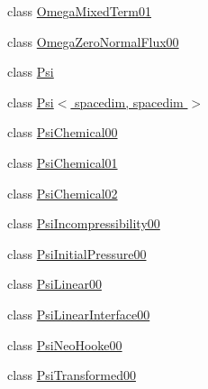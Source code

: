 \begin{DoxyCompactItemize}
\item 
class \hyperlink{classincremental_f_e_1_1_omega_mixed_term01}{Omega\+Mixed\+Term01}
\item 
class \hyperlink{classincremental_f_e_1_1_omega_zero_normal_flux00}{Omega\+Zero\+Normal\+Flux00}
\item 
class \hyperlink{classincremental_f_e_1_1_psi}{Psi}
\item 
class \hyperlink{classincremental_f_e_1_1_psi_3_01spacedim_00_01spacedim_01_4}{Psi$<$ spacedim, spacedim $>$}
\item 
class \hyperlink{classincremental_f_e_1_1_psi_chemical00}{Psi\+Chemical00}
\item 
class \hyperlink{classincremental_f_e_1_1_psi_chemical01}{Psi\+Chemical01}
\item 
class \hyperlink{classincremental_f_e_1_1_psi_chemical02}{Psi\+Chemical02}
\item 
class \hyperlink{classincremental_f_e_1_1_psi_incompressibility00}{Psi\+Incompressibility00}
\item 
class \hyperlink{classincremental_f_e_1_1_psi_initial_pressure00}{Psi\+Initial\+Pressure00}
\item 
class \hyperlink{classincremental_f_e_1_1_psi_linear00}{Psi\+Linear00}
\item 
class \hyperlink{classincremental_f_e_1_1_psi_linear_interface00}{Psi\+Linear\+Interface00}
\item 
class \hyperlink{classincremental_f_e_1_1_psi_neo_hooke00}{Psi\+Neo\+Hooke00}
\item 
class \hyperlink{classincremental_f_e_1_1_psi_transformed00}{Psi\+Transformed00}
\end{DoxyCompactItemize}
